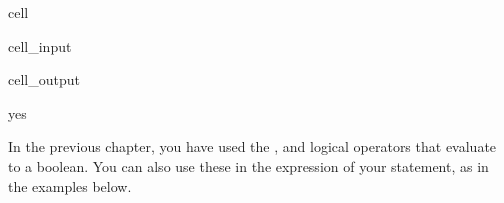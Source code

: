 \documentclass[letterpaper,10pt,english]{jupyterBook}
\begin{document}
\begin{sphinxuseclass}{cell}\begin{sphinxVerbatimInput}

\begin{sphinxuseclass}{cell_input}
\begin{sphinxVerbatim}[commandchars=\\\{\}]
                
\end{sphinxVerbatim}

\end{sphinxuseclass}\end{sphinxVerbatimInput}
\begin{sphinxVerbatimOutput}

\begin{sphinxuseclass}{cell_output}
\begin{sphinxVerbatim}[commandchars=\\\{\}]
yes
\end{sphinxVerbatim}

\end{sphinxuseclass}\end{sphinxVerbatimOutput}

\end{sphinxuseclass}
\sphinxAtStartPar
In the previous chapter, you have used the ,  and  logical operators that evaluate to a boolean. You can also use these in the expression of your  statement, as in the examples below.
\end{document}
